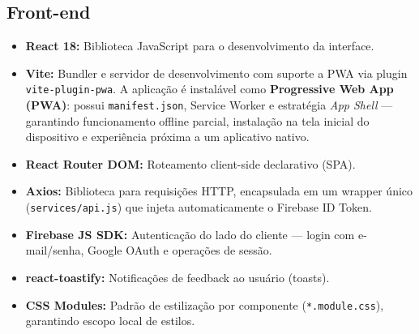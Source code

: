 \documentclass[
    12pt, 
    a4paper, 
    oneside, 
    chapter=TITLE, 
    section=TITLE
]{abntex2}
\begin{document}
\subsection{Front-end}
\begin{itemize}
    \item \textbf{React 18:} Biblioteca JavaScript para o desenvolvimento da interface.
    \item \textbf{Vite:} Bundler e servidor de desenvolvimento com suporte a PWA via plugin \texttt{vite-plugin-pwa}. A aplicação é instalável como \textbf{Progressive Web App (PWA)}: possui \texttt{manifest.json}, Service Worker e estratégia \textit{App Shell} — garantindo funcionamento offline parcial, instalação na tela inicial do dispositivo e experiência próxima a um aplicativo nativo.
    \item \textbf{React Router DOM:} Roteamento client-side declarativo (SPA).
    \item \textbf{Axios:} Biblioteca para requisições HTTP, encapsulada em um wrapper único (\texttt{services/api.js}) que injeta automaticamente o Firebase ID Token.
    \item \textbf{Firebase JS SDK:} Autenticação do lado do cliente — login com e-mail/senha, Google OAuth e operações de sessão.
    \item \textbf{react-toastify:} Notificações de feedback ao usuário (toasts).
    \item \textbf{CSS Modules:} Padrão de estilização por componente (\texttt{*.module.css}), garantindo escopo local de estilos.
\end{itemize}
\end{document}
